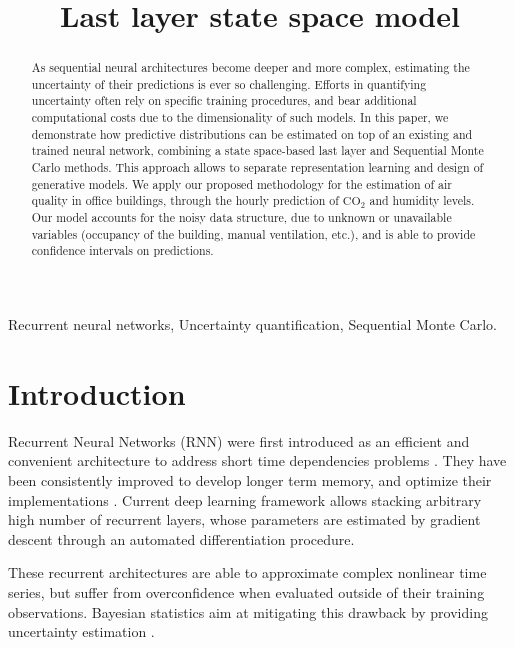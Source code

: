 \documentclass{article}
\title{Last layer state space model}
\begin{document}
\maketitle

\begin{abstract}
	As sequential neural architectures become deeper and more complex, estimating the uncertainty of their predictions is ever so challenging.
	Efforts in quantifying uncertainty often rely on specific training procedures, and bear additional computational costs due to the dimensionality of such models.
	In this paper, we demonstrate how predictive distributions can be estimated on top of an existing and trained neural network, combining a state space-based last  layer and  Sequential Monte Carlo methods. This approach allows to separate representation learning and design of generative models. We apply our proposed methodology for the estimation of air quality in office buildings, through the hourly prediction of \ensuremath{\mathrm{CO_2}} and humidity levels.
	Our model accounts for the noisy data structure, due to unknown or unavailable variables (occupancy of the building, manual ventilation, etc.), and is able to provide confidence intervals on predictions.
\end{abstract}

\begin{keywords}
	Recurrent neural networks, Uncertainty quantification, Sequential Monte Carlo.
\end{keywords}

\section{Introduction}
\label{sec:intro}

Recurrent Neural Networks (RNN) were first introduced as an efficient and convenient architecture to address short time dependencies problems \cite{Mozer1989AFB}.
They have been consistently improved to develop longer term memory, and optimize their implementations \cite{Bengio1994LearningLD,Hochreiter1997LongSM,Cho2014LearningPR}.
Current deep learning framework allows stacking arbitrary high number of recurrent layers, whose parameters are estimated by gradient descent through an automated differentiation procedure.

These recurrent architectures are able to approximate complex nonlinear time series, but suffer from overconfidence when evaluated outside of their training observations. Bayesian statistics aim at mitigating this drawback by providing uncertainty estimation \cite{Hinton1995BayesianLF,MacKay1992}.
\end{document}
